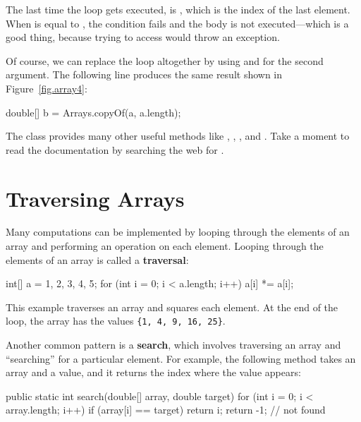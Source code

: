 The last time the loop gets executed,  is , which is the index of the last element.
When  is equal to , the condition fails and the body is not executed---which is a good thing, because trying to access  would throw an exception.

Of course, we can replace the loop altogether by using  and  for the second argument.
The following line produces the same result shown in Figure~\ref{fig.array4}:

\begin{code}
double[] b = Arrays.copyOf(a, a.length);
\end{code}

The  class provides many other useful methods like , , , and .
Take a moment to read the documentation by searching the web for .


\section{Traversing Arrays}
\label{traversal}


Many computations can be implemented by looping through the elements of an array and performing an operation on each element.
Looping through the elements of an array is called a {\bf traversal}:

\begin{code}
int[] a = {1, 2, 3, 4, 5};
for (int i = 0; i < a.length; i++) {
    a[i] *= a[i];
}
\end{code}

This example traverses an array and squares each element.
At the end of the loop, the array has the values \verb"{1, 4, 9, 16, 25}".


Another common pattern is a {\bf search}, which involves traversing an array and ``searching'' for a particular element.
For example, the following method takes an array and a value, and it returns the index where the value appears:


\begin{code}
public static int search(double[] array, double target) {
    for (int i = 0; i < array.length; i++) {
        if (array[i] == target) {
            return i;
        }
    }
    return -1;  // not found
}
\end{code}

